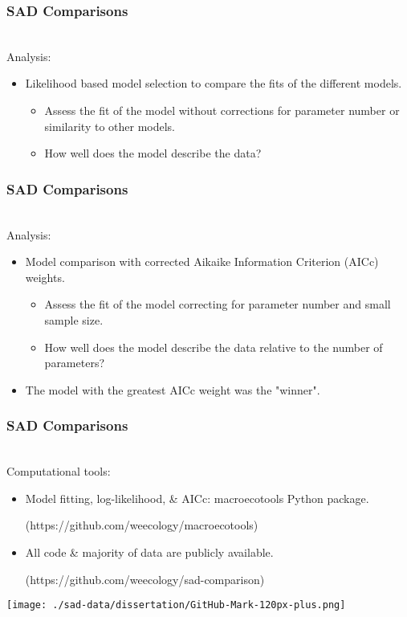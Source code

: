 \documentclass[14pt]{beamer}
\begin{document}
\begin{frame}[t]
\frametitle{SAD Comparisons}
~\\
Analysis:
\begin{itemize}
\item Likelihood based model selection to compare the fits of the different models.
\begin{itemize}
\item Assess the fit of the model without corrections for parameter number or similarity to other models.
\item How well does the model describe the data?
\end{itemize}
\end{itemize}
\end{frame}

\begin{frame}[t]
\frametitle{SAD Comparisons}
~\\
Analysis:
\begin{itemize}
\item Model comparison with corrected Aikaike Information Criterion (AICc) weights.
\begin{itemize}
\item Assess the fit of the model correcting for parameter number and small sample size.
\item How well does the model describe the data relative to the number of parameters?
\end{itemize}
\item The model with the greatest AICc weight was the "winner". 
\end{itemize}
\end{frame}

\begin{frame}
\frametitle{SAD Comparisons}
~\\
Computational tools:
\begin{itemize}
\item Model fitting, log-likelihood, \& AICc: macroecotools Python package.\\
\begin{small}
(https://github.com/weecology/macroecotools)
\end{small}
\item All code \& majority of data are publicly available.
\begin{small}
(https://github.com/weecology/sad-comparison)
\end{small}
\end{itemize}
\begin{center}
\texttt{[image: ./sad-data/dissertation/GitHub-Mark-120px-plus.png]}
\end{center}
\end{frame}
\end{document}
